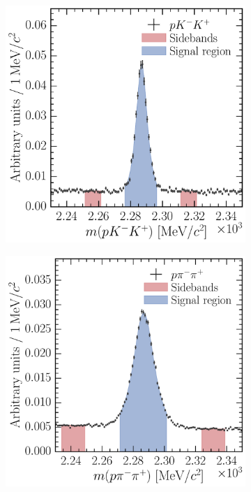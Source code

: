\begin{figure}
  \begin{subfigure}[b]{0.5\textwidth}
    \includegraphics[width=\textwidth]{cpv/systematics/LcTopKK_2012_MagDown_Lb_DTF_Lc_M.pdf}
    \caption{\pKK}
    \label{fig:cpv:syst:mass_windows:pKK}
  \end{subfigure}
  \begin{subfigure}[b]{0.5\textwidth}
    \includegraphics[width=\textwidth]{cpv/systematics/LcToppipi_2012_MagDown_Lb_DTF_Lc_M.pdf}

\end{subfigure}
\end{figure}
